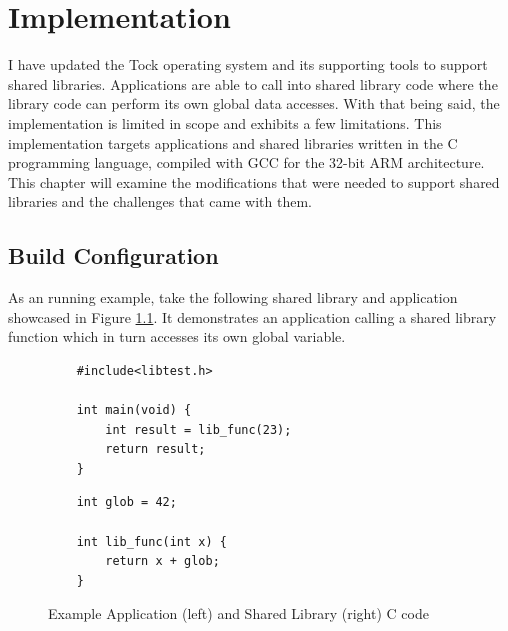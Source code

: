 \documentclass[12pt]{ucsddissertation}
\begin{document}



\chapter{Implementation}


I have updated the Tock operating system and its supporting tools to support shared libraries. Applications are able to call into shared library code where the library code can perform its own global data accesses. With that being said, the implementation is limited in scope and exhibits a few limitations. This implementation targets applications and shared libraries written in the C programming language, compiled with GCC for the 32-bit ARM architecture. This chapter will examine the modifications that were needed to support shared libraries and the challenges that came with them.


\section{Build Configuration} \label{impl-build}

As an running example, take the following shared library and application showcased in Figure \ref{fig:examplecode}. It demonstrates an application calling a shared library function which in turn accesses its own global variable.

\begin{figure}[!h]
\centering
 \begin{minipage}{0.47\textwidth}
  \centering
  \begin{verbatim}
    #include<libtest.h>

    int main(void) {
        int result = lib_func(23);
        return result;
    }
  \end{verbatim}
     \caption[]{Application (\textit{main.c})}
     \label{fig:appcode}
 \end{minipage}
 \begin{minipage}{0.47\textwidth}
  \centering
  \begin{verbatim}
    int glob = 42;

    int lib_func(int x) {
        return x + glob;
    }

  \end{verbatim}
     \caption[]{Shared Library (\textit{libtest.c})}
     \label{fig:shlibcode}
 \end{minipage}
 \caption[Example Application and Shared Library Code]{Example Application (left) and Shared Library (right) C code}
  \label{fig:examplecode}
\end{figure}
\end{document}
